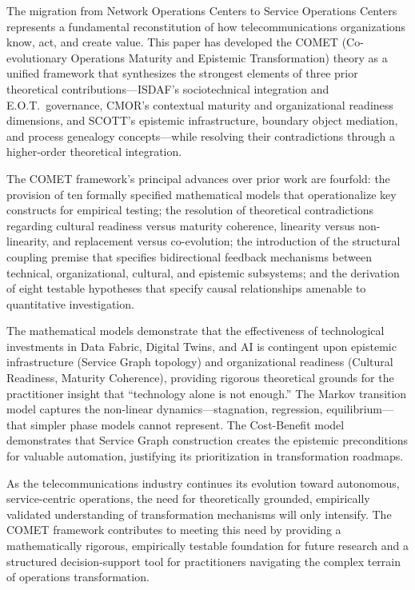 \documentclass[12pt,a4paper]{article}
\begin{document}
The migration from Network Operations Centers to Service Operations Centers represents a fundamental reconstitution of how telecommunications organizations know, act, and create value. This paper has developed the COMET (Co-evolutionary Operations Maturity and Epistemic Transformation) theory as a unified framework that synthesizes the strongest elements of three prior theoretical contributions---ISDAF's sociotechnical integration and E.O.T.\ governance, CMOR's contextual maturity and organizational readiness dimensions, and SCOTT's epistemic infrastructure, boundary object mediation, and process genealogy concepts---while resolving their contradictions through a higher-order theoretical integration.

The COMET framework's principal advances over prior work are fourfold: the provision of ten formally specified mathematical models that operationalize key constructs for empirical testing; the resolution of theoretical contradictions regarding cultural readiness versus maturity coherence, linearity versus non-linearity, and replacement versus co-evolution; the introduction of the structural coupling premise that specifies bidirectional feedback mechanisms between technical, organizational, cultural, and epistemic subsystems; and the derivation of eight testable hypotheses that specify causal relationships amenable to quantitative investigation.

The mathematical models demonstrate that the effectiveness of technological investments in Data Fabric, Digital Twins, and AI is contingent upon epistemic infrastructure (Service Graph topology) and organizational readiness (Cultural Readiness, Maturity Coherence), providing rigorous theoretical grounds for the practitioner insight that ``technology alone is not enough.'' The Markov transition model captures the non-linear dynamics---stagnation, regression, equilibrium---that simpler phase models cannot represent. The Cost-Benefit model demonstrates that Service Graph construction creates the epistemic preconditions for valuable automation, justifying its prioritization in transformation roadmaps.

As the telecommunications industry continues its evolution toward autonomous, service-centric operations, the need for theoretically grounded, empirically validated understanding of transformation mechanisms will only intensify. The COMET framework contributes to meeting this need by providing a mathematically rigorous, empirically testable foundation for future research and a structured decision-support tool for practitioners navigating the complex terrain of operations transformation.

\newpage


\end{document}
